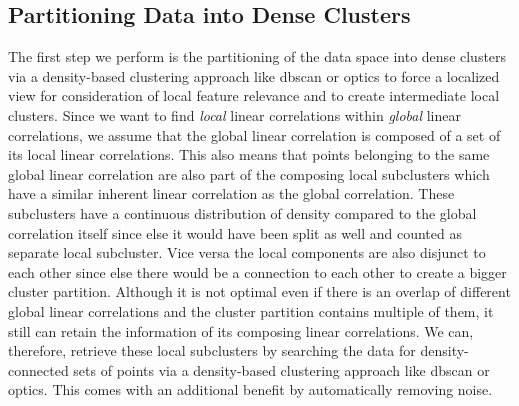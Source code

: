 \subsection{Partitioning Data into Dense Clusters}\label{ssec:partitioning}
The first step we perform is the partitioning of the data space into dense clusters via a density-based clustering approach like \gls{dbscan} or \gls{optics} to force a localized view for consideration of local feature relevance and to create intermediate local clusters. 
Since we want to find \textit{local} linear correlations within \textit{global} linear correlations, we assume that the global linear correlation is composed of a set of its local linear correlations. This also means that points belonging to the same global linear correlation are also part of the composing local subclusters which have a similar inherent linear correlation as the global correlation. These subclusters have a continuous distribution of density compared to the global correlation itself since else it would have been split as well and counted as separate local subcluster. Vice versa the local components are also disjunct to each other since else there would be a connection to each other to create a bigger cluster partition. Although it is not optimal even if there is an overlap of different global linear correlations and the cluster partition contains multiple of them, it still can retain the information of its composing linear correlations.
We can, therefore, retrieve these local subclusters by searching the data for density-connected sets of points via a density-based clustering approach like \gls{dbscan} or \gls{optics}. This comes with an additional benefit by automatically removing noise. 

